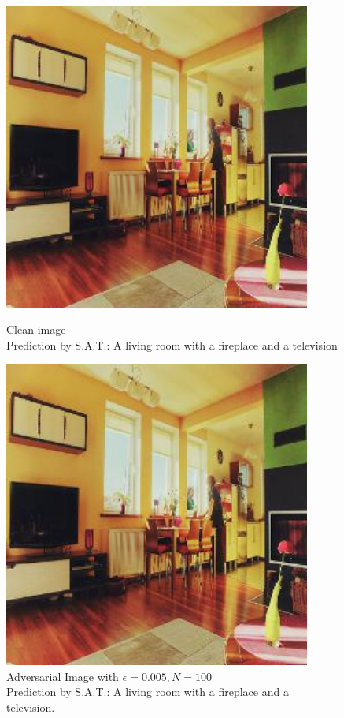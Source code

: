 \begin{figure}[ht]
    \centering
    \begin{minipage}{0.45\textwidth}
        \centering
        \includegraphics[width=0.9\textwidth]{figures/Distract/n=100/samples/0.000/img_0.jpg} %
        \caption*{Clean image\\Prediction by S.A.T.: A living room with a fireplace and a television}
    \end{minipage}\hfill
    \begin{minipage}{0.45\textwidth}
        \centering
        \includegraphics[width=0.9\textwidth]{figures/Distract/n=100/samples/0.005/img_0.jpg} %
        \caption*{Adversarial Image with $\epsilon=0.005, N=100$\\Prediction by S.A.T.: A living room with a fireplace and a television.}
    \end{minipage}
\end{figure}

